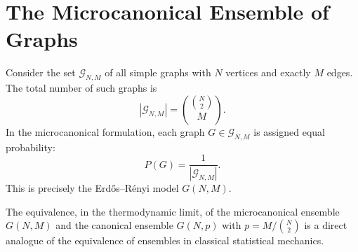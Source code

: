 \section{The Microcanonical Ensemble of Graphs}

Consider the set $\mathcal{G}_{N,M}$ of all simple graphs with $N$ vertices and exactly $M$ edges. The total number of such graphs is
\[
|\mathcal{G}_{N,M}| = \binom{\binom{N}{2}}{M}.
\]
In the microcanonical formulation, each graph $G \in \mathcal{G}_{N,M}$ is assigned equal probability:
\[
P(G) = \frac{1}{|\mathcal{G}_{N,M}|}.
\]
This is precisely the Erd\H{o}s--R\'{e}nyi model $G(N,M)$.

\begin{pullquote}
The equivalence, in the thermodynamic limit, of the microcanonical ensemble $G(N,M)$ and the canonical ensemble $G(N,p)$ with $p = M / \binom{N}{2}$ is a direct analogue of the equivalence of ensembles in classical statistical mechanics.
\end{pullquote}
